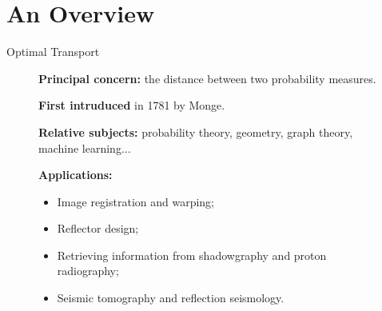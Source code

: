 \section{An Overview}

\begin{frame}{Optimal Transport}
    \scriptsize
    \vspace{-1.5em}
    \begin{figure}
        \captionsetup{font=tiny}
        \begin{minipage}[t]{0.6\linewidth}
            \vspace{0pt}
            \textbf{Principal concern:} the distance between two probability measures.

            \textbf{First intruduced} in 1781 by Monge.

            \textbf{Relative subjects:} probability theory, geometry, graph theory, machine learning...

            \textbf{Applications:}
            \begin{itemize}
                \item Image registration and warping;
                \item Reflector design;
                \item Retrieving information from shadowgraphy and proton radiography;
                \item Seismic tomography and reflection seismology.
            \end{itemize}


\end{minipage}
\end{figure}
\end{frame}
